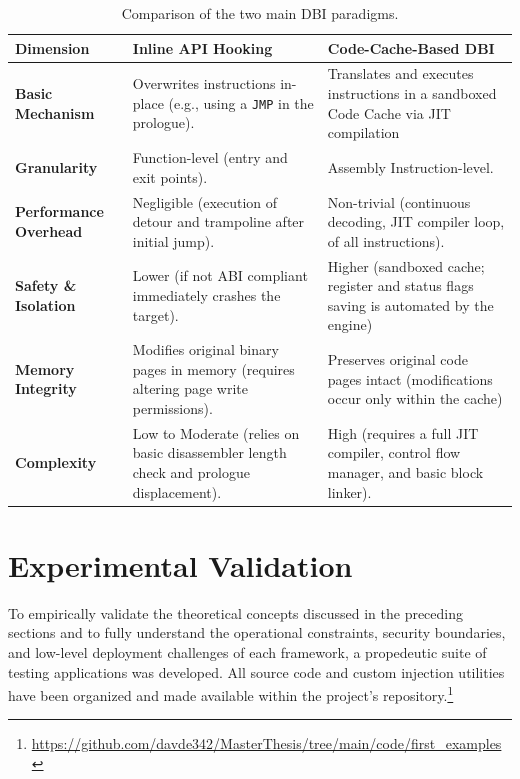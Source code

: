 \begin{table}[H]
	\centering
	\small
	\begin{tabular}{p{3.5cm}p{4.8cm}p{4.8cm}}
		\toprule
		\textbf{Dimension} & \textbf{Inline API Hooking} & \textbf{Code-Cache-Based DBI} \\
		\midrule
		\textbf{Basic Mechanism} & Overwrites instructions in-place (e.g., using a \texttt{JMP} in the prologue). & Translates and executes instructions in a sandboxed Code Cache via JIT compilation \\
		\addlinespace
		\textbf{Granularity} & Function-level (entry and exit points). & Assembly Instruction-level. \\
		\addlinespace
		\textbf{Performance Overhead} & Negligible (execution of detour and trampoline after initial jump). & Non-trivial (continuous decoding, JIT compiler loop, of all instructions). \\
		\addlinespace
		\textbf{Safety \& Isolation} & Lower (if not ABI compliant immediately crashes the target). & Higher (sandboxed cache; register and status flags saving is automated by the engine) \\
		\addlinespace
		\textbf{Memory Integrity} & Modifies original binary pages in memory (requires altering page write permissions). & Preserves original code pages intact (modifications occur only within the cache) \\
		\addlinespace
		\textbf{Complexity} & Low to Moderate (relies on basic disassembler length check and prologue displacement). & High (requires a full JIT compiler, control flow manager, and basic block linker). \\
		\bottomrule
	\end{tabular}
	\caption{Comparison of the two main DBI paradigms.}
	\label{tab:paradigm_comparison}
\end{table}

\section{Experimental Validation}
\label{sec:experimental_validation}

To empirically validate the theoretical concepts discussed in the preceding sections and to fully understand the operational constraints, security boundaries, and low-level deployment challenges of each framework, a propedeutic suite of testing applications was developed. All source code and custom injection utilities have been organized and made available within the project's repository.\footnote{\url{https://github.com/davde342/MasterThesis/tree/main/code/first_examples}} 

